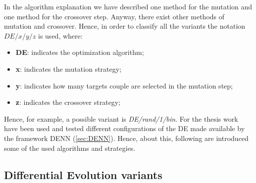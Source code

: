 In the algorithm explanation we have described one method for the mutation and one method for the crossover step. Anyway, there exist other methods of mutation and crossover. Hence, in order to classify all the variants the notation $DE/x/y/z$ is used, where:
\begin{itemize}
	\item{\textbf{DE}: indicates the optimization algorithm;}
	\item{\textbf{x}: indicates the mutation strategy;}
	\item{\textbf{y}: indicates how many targets couple are selected in the mutation step;}
	\item{\textbf{z}: indicates the crossover strategy;}
\end{itemize}
Hence, for example, a possible variant is \textit{DE/rand/1/bin}. For the thesis work have been used and tested different configurations of the DE made available by the framework DENN (\ref{sec:DENN}). Hence, about this, following are introduced some of the used algorithms and strategies.
\subsection{Differential Evolution variants}

